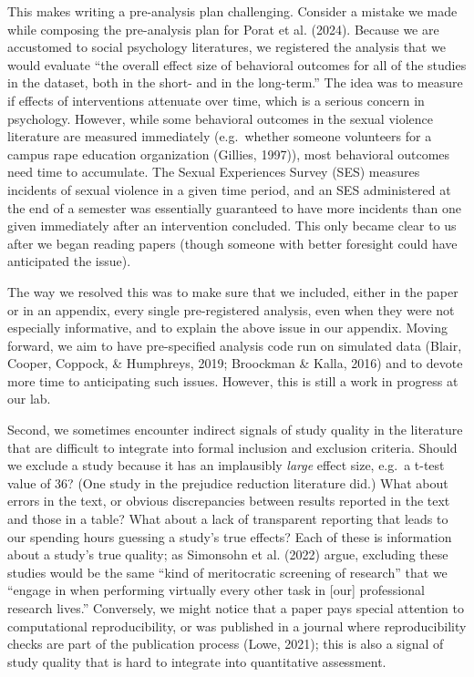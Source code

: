 \documentclass[
  ,jou]{apa6}
\begin{document}
This makes writing a pre-analysis plan challenging. Consider a mistake we made while composing the pre-analysis plan for Porat et al. (2024). Because we are accustomed to social psychology literatures, we registered the analysis that we would evaluate ``the overall effect size of behavioral outcomes for all of the studies in the dataset, both in the short- and in the long-term.'' The idea was to measure if effects of interventions attenuate over time, which is a serious concern in psychology. However, while some behavioral outcomes in the sexual violence literature are measured immediately (e.g.~whether someone volunteers for a campus rape education organization (Gillies, 1997)), most behavioral outcomes need time to accumulate. The Sexual Experiences Survey (SES) measures incidents of sexual violence in a given time period, and an SES administered at the end of a semester was essentially guaranteed to have more incidents than one given immediately after an intervention concluded. This only became clear to us after we began reading papers (though someone with better foresight could have anticipated the issue).

The way we resolved this was to make sure that we included, either in the paper or in an appendix, every single pre-registered analysis, even when they were not especially informative, and to explain the above issue in our appendix. Moving forward, we aim to have pre-specified analysis code run on simulated data (Blair, Cooper, Coppock, \& Humphreys, 2019; Broockman \& Kalla, 2016) and to devote more time to anticipating such issues. However, this is still a work in progress at our lab.

Second, we sometimes encounter indirect signals of study quality in the literature that are difficult to integrate into formal inclusion and exclusion criteria. Should we exclude a study because it has an implausibly \emph{large} effect size, e.g.~a t-test value of 36? (One study in the prejudice reduction literature did.) What about errors in the text, or obvious discrepancies between results reported in the text and those in a table? What about a lack of transparent reporting that leads to our spending hours guessing a study's true effects? Each of these is information about a study's true quality; as Simonsohn et al. (2022) argue, excluding these studies would be the same ``kind of meritocratic screening of research'' that we ``engage in when performing virtually every other task in {[}our{]} professional research lives.'' Conversely, we might notice that a paper pays special attention to computational reproducibility, or was published in a journal where reproducibility checks are part of the publication process (Lowe, 2021); this is also a signal of study quality that is hard to integrate into quantitative assessment.
\end{document}
